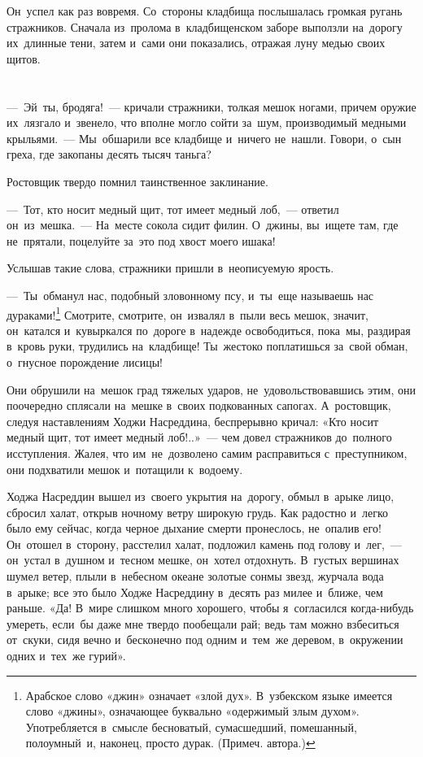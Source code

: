 \documentclass[12pt,a4paper]{book}
\begin{document}
Он~успел как раз вовремя. Со~стороны кладбища послышалась громкая ругань стражников. Сначала из~пролома в~кладбищенском заборе выползли на~дорогу их~длинные тени, затем и~сами они показались, отражая луну медью своих щитов.


\chapter{}

—~Эй~ты, бродяга!~— кричали стражники, толкая мешок ногами, причем оружие их~лязгало и~звенело, что вполне могло сойти за~шум, производимый медными крыльями.~— Мы~обшарили все кладбище и~ничего не~нашли. Говори, о~сын греха, где закопаны десять тысяч таньга?

Ростовщик твердо помнил таинственное заклинание.

—~Тот, кто носит медный щит, тот имеет медный лоб,~— ответил он~из~мешка.~— На~месте сокола сидит филин. О~джины, вы~ищете там, где не~прятали, поцелуйте за~это под хвост моего ишака!

Услышав такие слова, стражники пришли в~неописуемую ярость.

—~Ты~обманул нас, подобный зловонному псу, и~ты~еще называешь нас дураками!\footnote{Арабское слово «джин» означает «злой дух». В~узбекском языке имеется слово «джины», означающее буквально «одержимый злым духом». Употребляется в~смысле бесноватый, сумасшедший, помешанный, полоумный~и, наконец, просто дурак. (Примеч. автора.)} Смотрите, смотрите, он~извалял в~пыли весь мешок, значит, он~катался и~кувыркался по~дороге в~надежде освободиться, пока~мы, раздирая в~кровь руки, трудились на~кладбище! Ты~жестоко поплатишься за~свой обман, о~гнусное порождение лисицы!

Они обрушили на~мешок град тяжелых ударов, не~удовольствовавшись этим, они поочередно сплясали на~мешке в~своих подкованных сапогах. А~ростовщик, следуя наставлениям Ходжи Насреддина, беспрерывно кричал: «Кто носит медный щит, тот имеет медный лоб!..»~— чем довел стражников до~полного исступления. Жалея, что им~не~дозволено самим расправиться с~преступником, они подхватили мешок и~потащили к~водоему.

Ходжа Насреддин вышел из~своего укрытия на~дорогу, обмыл в~арыке лицо, сбросил халат, открыв ночному ветру широкую грудь. Как радостно и~легко было ему сейчас, когда черное дыхание смерти пронеслось, не~опалив его! Он~отошел в~сторону, расстелил халат, подложил камень под голову и~лег,~— он~устал в~душном и~тесном мешке, он~хотел отдохнуть. В~густых вершинах шумел ветер, плыли в~небесном океане золотые сонмы звезд, журчала вода в~арыке; все это было Ходже Насреддину в~десять раз милее и~ближе, чем раньше. «Да! В~мире слишком много хорошего, чтобы я~согласился когда-нибудь умереть, если~бы даже мне твердо пообещали рай; ведь там можно взбеситься от~скуки, сидя вечно и~бесконечно под одним и~тем~же деревом, в~окружении одних и~тех~же гурий».
\end{document}

